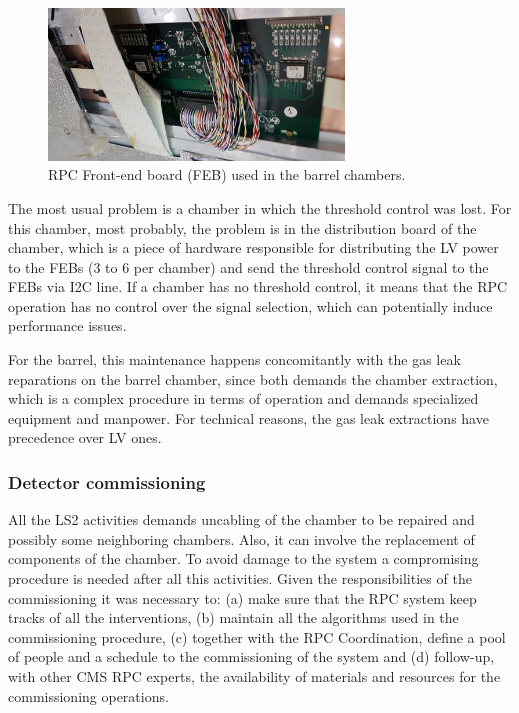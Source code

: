 \begin{figure}[h]
\begin{center}
\includegraphics[width=0.7\textwidth,keepaspectratio]{figures_and_tables/rpc/rpc_feb.jpg}
\end{center}
\caption{RPC Front-end board (FEB) used in the barrel chambers.}\label{rpc_feb}
\end{figure}

The most usual problem is a chamber in which the threshold control was lost. For this chamber, most probably, the problem is in the distribution board of the chamber, which is a piece of hardware responsible for distributing the LV power to the FEBs (3 to 6 per chamber) and send the threshold control signal to the FEBs via I2C line. If a chamber has no threshold control, it means that the RPC operation has no control over the signal selection, which can potentially induce performance issues. 

For the barrel, this maintenance happens concomitantly with the gas leak reparations on the barrel chamber, since both demands the chamber extraction, which is a complex procedure in terms of operation and demands specialized equipment and manpower. For technical reasons, the gas leak extractions have precedence over LV ones.



\subsubsection{Detector commissioning}
 
All the LS2 activities demands uncabling of the chamber to be repaired and possibly some neighboring chambers. Also, it can involve the replacement of components of the chamber. To avoid damage to the system a compromising procedure is needed after all this activities. Given the responsibilities of the commissioning it was necessary to: (a) make sure that the RPC system keep tracks of all the interventions, (b) maintain all the algorithms used in the commissioning procedure, (c) together with the RPC Coordination, define a pool of people and a schedule to the commissioning of the system and (d) follow-up, with other CMS RPC experts, the availability of materials and resources for the commissioning operations.

